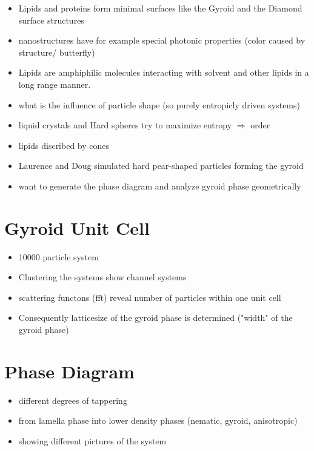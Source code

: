 \documentclass[epj,twocolumn]{webofc}
\begin{document}
\begin{itemize}
    \item Lipids and proteins form minimal surfaces like the Gyroid and the Diamond surface structures
    \item nanostructures have for example special photonic properties (color caused by structure/ butterfly)
    \item Lipids are amphiphilic molecules interacting with solvent and other lipids in a long range manner.
    \item what is the influence of particle shape (so purely entropicly driven systems)
    \item liquid crystals and Hard spheres try to maximize entropy $\Rightarrow$ order
    \item lipids discribed by cones
    \item Laurence and Doug simulated hard pear-shaped particles forming the gyroid
    \item want to generate the phase diagram and analyze gyroid phase geometrically
\end{itemize}

\section{Gyroid Unit Cell}
\label{sec:UnitCell}

\begin{itemize}
    \item 10000 particle system
    \item Clustering the systems show channel systems
    \item scattering functons (fft) reveal number of particles within one unit cell
    \item Consequently latticesize of the gyroid phase is determined ("width" of the gyroid phase)
\end{itemize}

\section{Phase Diagram}
\label{sec:PhaseDiagram}

\begin{itemize}
    \item different degrees of tappering
    \item from lamella phase into lower density phases (nematic, gyroid, anisotropic)
    \item showing different pictures of the system
\end{itemize}
\end{document}

